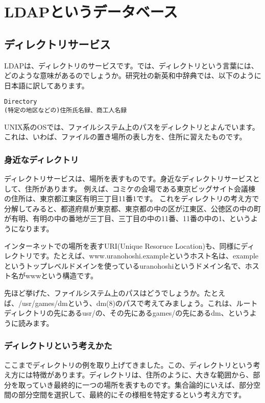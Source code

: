 \chapter{LDAPというデータベース}

\section{ディレクトリサービス}

LDAPは、ディレクトリのサービスです。では、ディレクトリという言葉には、どのような意味があるのでしょうか。研究社の新英和中辞典では、以下のように日本語に訳してあります。

\begin{verbatim}
Directory
(特定の地区などの)住所氏名録、商工人名録
\end{verbatim}

UNIX系のOSでは、ファイルシステム上のパスをディレクトリとよんでいます。これは、いわば、ファイルの置き場所の表し方を、住所に習えたものです。

\subsection{身近なディレクトリ}

ディレクトリサービスは、場所を表すものです。身近なディレクトリサービスとして、住所があります。
例えば、コミケの会場である東京ビッグサイト会議棟の住所は、東京都江東区有明三丁目11番1です。
これをディレクトリの考え方で分解してみると、都道府県が東京都、東京都の中の区が江東区、公徳区の中の町が有明、有明の中の番地が三丁目、三丁目の中の11番、11番の中の1、というようになります。

インターネットでの場所を表すURI(Unique Resoruce Location)も、同様にディレクトリです。たとえば、www.uranohoshi.exampleというホスト名は、exampleというトップレベルドメインを使っているuranohoshiというドメイン名で、ホスト名がwwwという構造です。

先ほど挙げた、ファイルシステム上のパスはどうでしょうか。たとえば、/usr/games/dmという、dm(8)のパスで考えてみましょう。これは、ルートディレクトリの先にあるusr/の、その先にあるgames/の先にあるdm、というように読みます。

\subsection{ディレクトリという考えかた}

ここまでディレクトリの例を取り上げてきました。この、ディレクトリという考え方には特徴があります。ディレクトリは、住所のように、大きな範囲から、部分を取っていき最終的に一つの場所を表すものです。集合論的にいえば、部分空間の部分空間を選択して、最終的にその様相を特定するという考え方です。

